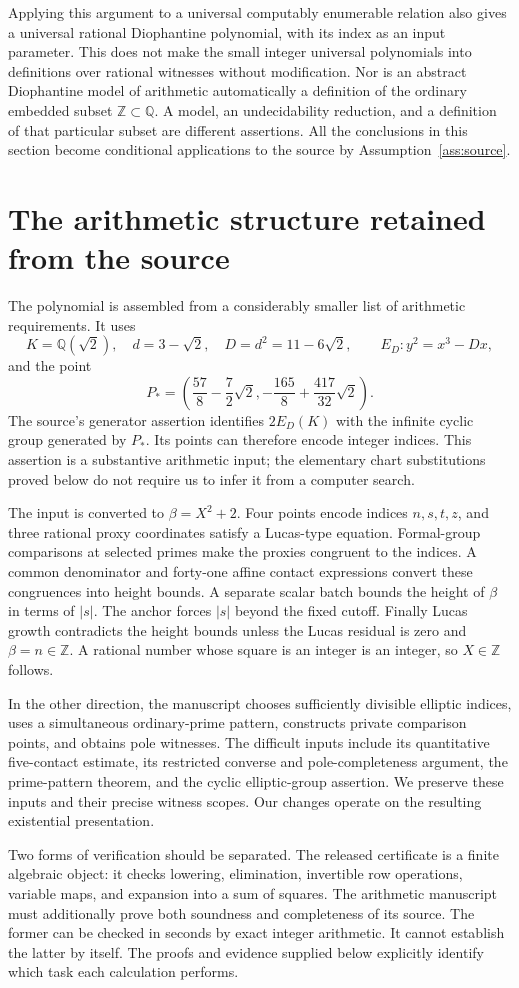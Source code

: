 \documentclass[11pt]{article}
\theoremstyle{definition}
\newcommand{\Q}{\mathbb Q}
\newcommand{\Z}{\mathbb Z}
\begin{document}
Applying this argument to a universal computably enumerable relation
also gives a universal rational Diophantine polynomial, with its index
as an input parameter. This does not make the small integer universal
polynomials into definitions over rational witnesses without modification.
Nor is an abstract Diophantine model of arithmetic automatically a
definition of the ordinary embedded subset $\Z\subset\Q$. A model,
an undecidability reduction, and a definition of that particular subset
are different assertions. All the conclusions in this section become
conditional applications to the source by
Assumption~\ref{ass:source}.

\section{The arithmetic structure retained from the source}
\label{sec:source-structure}

The polynomial is assembled from a considerably smaller list of
arithmetic requirements. It uses
\[
 K=\Q(\sqrt2),\quad d=3-\sqrt2,\quad D=d^2=11-6\sqrt2,
 \qquad E_D:y^2=x^3-Dx,
\]
and the point
\[
 P_*=\left(\frac{57}{8}-\frac72\sqrt2,
 -\frac{165}{8}+\frac{417}{32}\sqrt2\right).
\]
The source's generator assertion identifies $2E_D(K)$ with the
infinite cyclic group generated by $P_*$. Its points can therefore
encode integer indices. This assertion is a substantive arithmetic
input; the elementary chart substitutions proved below do not require
us to infer it from a computer search.

The input is converted to $\beta=X^2+2$. Four points encode indices
$n,s,t,z$, and three rational proxy coordinates satisfy a Lucas-type
equation. Formal-group comparisons at selected primes make the proxies
congruent to the indices. A common denominator and forty-one affine
contact expressions convert these congruences into height bounds.
A separate scalar batch bounds the height of $\beta$ in terms of
$|s|$. The anchor forces $|s|$ beyond the fixed cutoff. Finally Lucas
growth contradicts the height bounds unless the Lucas residual is zero
and $\beta=n\in\Z$. A rational number whose square is an integer
is an integer, so $X\in\Z$ follows.

In the other direction, the manuscript chooses sufficiently divisible
elliptic indices, uses a simultaneous ordinary-prime pattern, constructs
private comparison points, and obtains pole witnesses. The difficult
inputs include its quantitative five-contact estimate, its restricted
converse and pole-completeness argument, the prime-pattern theorem,
and the cyclic elliptic-group assertion. We preserve these inputs and
their precise witness scopes. Our changes operate on the resulting
existential presentation.

Two forms of verification should be separated. The released certificate
is a finite algebraic object: it checks lowering, elimination, invertible
row operations, variable maps, and expansion into a sum of squares.
The arithmetic manuscript must additionally prove both soundness and
completeness of its source. The former can be checked in seconds by exact
integer arithmetic. It cannot establish the latter by itself. The
proofs and evidence supplied below explicitly identify which task each
calculation performs.
\end{document}
